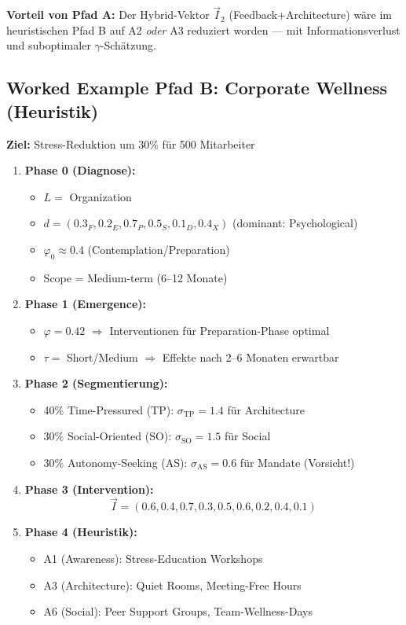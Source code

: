 \textbf{Vorteil von Pfad A:} Der Hybrid-Vektor $\vec{I}_2$ (Feedback+Architecture) wäre im heuristischen Pfad B auf A2 \textit{oder} A3 reduziert worden --- mit Informationsverlust und suboptimaler $\gamma$-Schätzung.

\subsection{Worked Example Pfad B: Corporate Wellness (Heuristik)}
\label{sec:20-workflow-example-B}

\textbf{Ziel:} Stress-Reduktion um 30\% für 500 Mitarbeiter

\begin{enumerate}
\item \textbf{Phase 0 (Diagnose):}
\begin{itemize}[nosep]
\item $L = $ Organization
\item $d = (0.3_F, 0.2_E, 0.7_P, 0.5_S, 0.1_D, 0.4_X)$ (dominant: Psychological)
\item $\varphi_0 \approx 0.4$ (Contemplation/Preparation)
\item Scope = Medium-term (6--12 Monate)
\end{itemize}

\item \textbf{Phase 1 (Emergence):}
\begin{itemize}[nosep]
\item $\varphi = 0.42$ $\Rightarrow$ Interventionen für Preparation-Phase optimal
\item $\tau =$ Short/Medium $\Rightarrow$ Effekte nach 2--6 Monaten erwartbar
\end{itemize}

\item \textbf{Phase 2 (Segmentierung):}
\begin{itemize}[nosep]
\item 40\% Time-Pressured (TP): $\sigma_{\text{TP}} = 1.4$ für Architecture
\item 30\% Social-Oriented (SO): $\sigma_{\text{SO}} = 1.5$ für Social
\item 30\% Autonomy-Seeking (AS): $\sigma_{\text{AS}} = 0.6$ für Mandate (Vorsicht!)
\end{itemize}

\item \textbf{Phase 3 (Intervention):}
\[
\vec{I} = (0.6, 0.4, 0.7, 0.3, 0.5, 0.6, 0.2, 0.4, 0.1)
\]

\item \textbf{Phase 4 (Heuristik):}
\begin{itemize}[nosep]
\item A1 (Awareness): Stress-Education Workshops
\item A3 (Architecture): Quiet Rooms, Meeting-Free Hours
\item A6 (Social): Peer Support Groups, Team-Wellness-Days
\end{itemize}


\end{enumerate}
